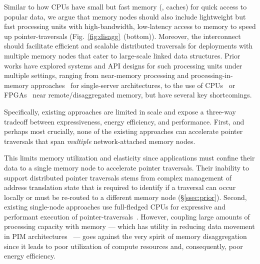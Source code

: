 Similar to how CPUs have small but fast memory (\ie, caches) for quick access to popular data, we argue that memory nodes should also include lightweight but fast processing units with high-bandwidth, low-latency access to memory to speed up pointer-traversals (Fig.~\ref{fig:disagg}~(bottom)). Moreover, the interconnect should facilitate efficient and scalable distributed traversals for deployments with multiple memory nodes that cater to large-scale linked data structures. Prior works have explored systems and API designs for such processing units under multiple settings, ranging from near-memory processing and processing-in-memory approaches~\cite{ahn2015scalable, asghari2016chameleon,  dai2018graphh, schuiki2018scalable, mutlu2019processing, lockerman2020livia, tu2022redcim, devic2022_PIM, wang2022_Nearstream, xie2023mpu, mutlu2022modern, oliveira2022accelerating, eckert2022eidetic, chi2016prime, seshadri2017simple, kwon2019_TensorDIMM, boroumand2019_codna, cho2020_data, ke2020_RecNMP, wang2021stream, xie2021spacea, ke2021near, singh2021fpga, olgun2022pidram, dai2022dimmining, gu2020ipim, gomez2023evaluating, walkers, impica} for single-server architectures, to the use of CPUs~\cite{storagefunctions, splinter, aifm, kayak_nsdi_21, storm_systor_19, zhang2022_teleport} or FPGAs~\cite{clio, strom} near remote/disaggregated memory, but have several key shortcomings. 


Specifically, existing approaches are limited in scale and expose a three-way tradeoff between expressiveness, energy efficiency, and performance. First, and perhaps most crucially, none of the existing approaches can accelerate pointer traversals that span \emph{multiple} network-attached memory nodes. 

This limits memory utilization and elasticity since applications must confine their data to a single memory node to accelerate pointer traversals. Their inability to support distributed pointer traversals stems from complex management of address translation state that is required to identify if a traversal can occur locally or must be re-routed to a different memory node (\S\ref{ssec:prior}). Second, existing single-node approaches use full-fledged CPUs for expressive and performant execution of pointer-traversals~\cite{storagefunctions, splinter, aifm, kayak_nsdi_21}. However, coupling large amounts of processing capacity with memory --- which has utility in reducing data movement in PIM architectures~\cite{ahn2015scalable, dai2018graphh, schuiki2018scalable, mutlu2019processing, mutlu2022modern, oliveira2022accelerating, eckert2022eidetic, xie2023mpu, tu2022redcim, lockerman2020livia, asghari2016chameleon, devic2022_PIM, wang2022_Nearstream} ---  goes against the very spirit of memory disaggregation since it leads to poor utilization of compute resources and, consequently, poor energy efficiency. 

